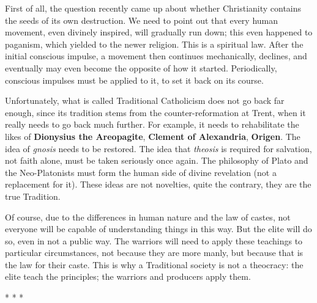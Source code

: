 First of all, the question recently came up about whether Christianity contains the seeds of its own destruction. We need to point out that every human movement, even divinely inspired, will gradually run down; this even happened to paganism, which yielded to the newer religion. This is a spiritual law. After the initial conscious impulse, a movement then continues mechanically, declines, and eventually may even become the opposite of how it started. Periodically, conscious impulses must be applied to it, to set it back on its course.

Unfortunately, what is called Traditional Catholicism does not go back far enough, since its tradition stems from the counter-reformation at Trent, when it really needs to go back much further. For example, it needs to rehabilitate the likes of \textbf{Dionysius the Areopagite}, \textbf{Clement of Alexandria}, \textbf{Origen}. The idea of \emph{gnosis} needs to be restored. The idea that \emph{theosis} is required for salvation, not faith alone, must be taken seriously once again. The philosophy of Plato and the Neo-Platonists must form the human side of divine revelation (not a replacement for it). These ideas are not novelties, quite the contrary, they are the true Tradition.

Of course, due to the differences in human nature and the law of castes, not everyone will be capable of understanding things in this way. But the elite will do so, even in not a public way. The warriors will need to apply these teachings to particular circumstances, not because they are more manly, but because that is the law for their caste. This is why a Traditional society is not a theocracy: the elite teach the principles; the warriors and producers apply them.




\begin{center}* * *\end{center}

